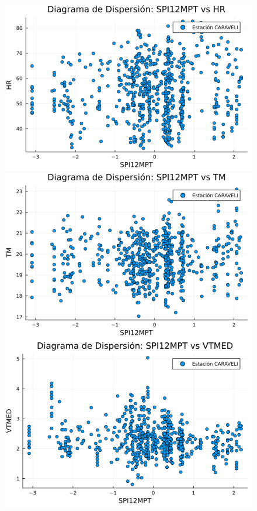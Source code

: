 \begin{figure}[htbp]
\begin{minipage}{0.32\textwidth}
    \centering
    \includegraphics[width=\linewidth]{Capitulos/Scaterplot/CARAVELI_SPI12MPT_vs_HR.png}
\end{minipage}\hfill
\begin{minipage}{0.32\textwidth}
    \centering
    \includegraphics[width=\linewidth]{Capitulos/Scaterplot/CARAVELI_SPI12MPT_vs_TM.png}
\end{minipage}\hfill
\begin{minipage}{0.32\textwidth}
    \centering
    \includegraphics[width=\linewidth]{Capitulos/Scaterplot/CARAVELI_SPI12MPT_vs_VTMED.png}
\end{minipage}


\end{figure}

